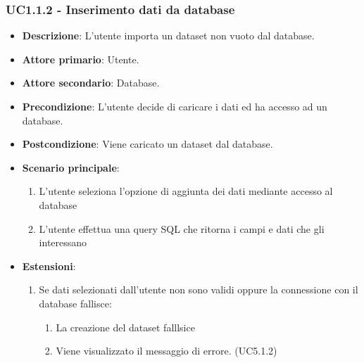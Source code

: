 \subsubsection{UC1.1.2 - Inserimento dati da database}
\label{ssub:UC1.1.2}
\begin{itemize}
    \item \textbf{Descrizione}: L'utente importa un dataset non vuoto dal database.

    \item \textbf{Attore primario}: Utente.
    
    \item \textbf{Attore secondario}: Database.
    
    \item \textbf{Precondizione}:   L'utente decide di caricare i dati ed ha accesso ad un database.

    \item \textbf{Postcondizione}:  Viene caricato un dataset dal database.

	\item \textbf{Scenario principale}:
		\begin{enumerate}
			\item L'utente seleziona l'opzione di aggiunta dei dati mediante accesso al database
			\item L'utente effettua una query SQL che ritorna i campi e dati che gli interessano
        \end{enumerate}

    \item \textbf{Estensioni}:
        \begin{enumerate}   
            \item Se dati selezionati dall'utente non sono validi oppure la connessione con il database fallisce:
            \begin{enumerate}
                \item La creazione del dataset falllsice
                \item Viene visualizzato il messaggio di errore. (UC5.1.2)
            \end{enumerate}
         \end{enumerate}
\end{itemize}


